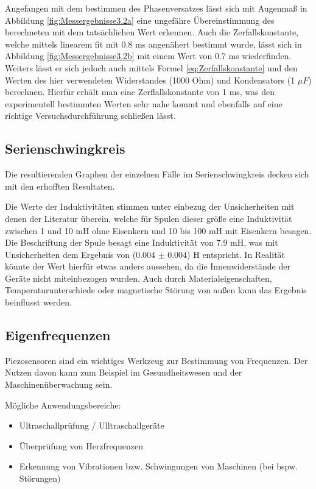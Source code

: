 \documentclass[12pt,a4paper,twoside]{article}
\begin{document}
Angefangen mit dem bestimmen des Phasenversatzes lässt sich mit Augenmaß in Abbildung \ref{fig:Messergebnisse3.2a} eine ungefähre Übereinstimmung des berechneten mit dem tatsächlichen Wert erkennen.
Auch die Zerfallskonstante, welche mittels linearem fit mit 0.8 ms angenähert bestimmt wurde, lässt sich in Abbildung \ref{fig:Messergebnisse3.2b} mit einem Wert von 0.7 ms wiederfinden. Weiters lässt er sich jedoch auch mittels Formel \ref{eq:Zerfallskonstante} und den Werten des hier verwendeten Widerstandes (1000 Ohm) und Kondensators (1 $\mu F$) berechnen. Hierfür erhält man eine Zerflallskonstante von 1 ms, was den experimentell bestimmten Werten sehr nahe kommt und ebenfalls auf eine richtige Versuchsdurchführung schließen lässt.


\subsection{Serienschwingkreis}

Die resultierenden Graphen der einzelnen Fälle im Serienschwingkreis decken sich mit den erhofften Resultaten. \newline

\noindent
Die Werte der Induktivitäten stimmen unter einbezug der Unsicherheiten mit denen der Literatur überein, welche für Spulen dieser größe eine Induktivität zwischen 1 und 10 mH ohne Eisenkern und 10 bis 100 mH mit Eisenkern besagen. Die Beschriftung der Spule besagt eine Induktivität von 7.9 mH, was mit Unsicherheiten dem Ergebnis von (0.004 $\pm$ 0.004) H entspricht. 
In Realität könnte der Wert hierfür etwas anders aussehen, da die Innenwiderstände der Geräte nicht miteinbezogen wurden. Auch durch Materialeigenschaften, Temperaturunterschiede oder magnetische Störung von außen kann das Ergebnis beinflusst werden. 


\subsection{Eigenfrequenzen}

Piezosensoren sind ein wichtiges Werkzeug zur Bestimmung von Frequenzen. Der Nutzen davon kann zum Beispiel im Gesundheitswesen und der Maschinenüberwachung sein. \newline

\noindent
Mögliche Anwendungsbereiche:

\begin{itemize}
    \item Ultraschallprüfung / Ulltraschallgeräte
    \item Überprüfung von Herzfrequenzen 
    \item Erkennung von Vibrationen bzw. Schwingungen von Maschinen (bei bspw. Störungen)
\end{itemize}
\end{document}
